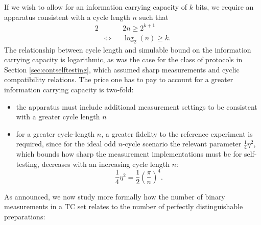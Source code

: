If we wish to allow for an information carrying capacity of $k$ bits, we require an apparatus consistent with a cycle length $n$ such that
\begin{alignat*}{2}
& && 2n\geq 2^{k+1} \\
& \iff && \log_2(n)\geq k.
\end{alignat*}
The relationship between cycle length and simulable bound on the information carrying capacity is logarithmic, as was the case for the class of protocols in Section \ref{sec:contselftesting}, which assumed sharp measurements and cyclic compatibility relations. The price one has to pay to account for a greater information carrying capacity is two-fold:
\begin{itemize}
\item the apparatus must include additional measurement settings to be consistent with a greater cycle length $n$
\item for a greater cycle-length $n$, a greater fidelity to the reference experiment is required, since for the ideal odd $n$-cycle scenario the relevant parameter $\frac{1}{4}\eta^2$, which bounds how sharp the measurement implementations must be for self-testing, decreases with an increasing cycle length $n$:
\begin{equation*}
\frac{1}{4}\eta^2 = \frac{1}{2}\left(\frac{\pi}{n}\right)^4.
\end{equation*}
\end{itemize}

As announced, we now study more formally how the number of binary measurements in a TC set relates to the number of perfectly distinguishable preparations:

